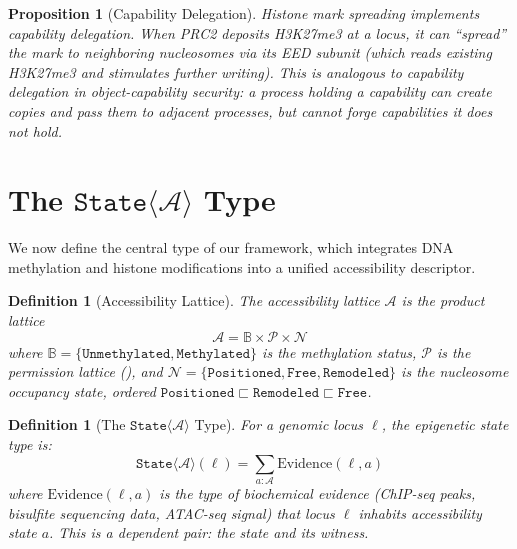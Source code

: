 \documentclass[12pt,a4paper]{article}
\newtheorem{proposition}[theorem]{Proposition}
\newtheorem{definition}[theorem]{Definition}
\newcommand{\Meth}{\texttt{Methylated}}
\newcommand{\Unmeth}{\texttt{Unmethylated}}
\newcommand{\StateT}{\texttt{State}}
\begin{document}
\begin{proposition}[Capability Delegation]
\label{prop:delegation}
Histone mark spreading implements capability delegation. When PRC2 deposits H3K27me3 at a locus, it can ``spread'' the mark to neighboring nucleosomes via its EED subunit (which reads existing H3K27me3 and stimulates further writing). This is analogous to capability delegation in object-capability security: a process holding a capability can create copies and pass them to adjacent processes, but cannot forge capabilities it does not hold.
\end{proposition}

\section{The \texorpdfstring{$\StateT\langle\mathcal{A}\rangle$}{State<A>} Type}
\label{sec:state-type}

We now define the central type of our framework, which integrates DNA methylation and histone modifications into a unified accessibility descriptor.

\begin{definition}[Accessibility Lattice]
\label{def:acc-lattice}
The \emph{accessibility lattice} $\mathcal{A}$ is the product lattice
\[
    \mathcal{A} = \mathbb{B} \times \mathcal{P} \times \mathcal{N}
\]
where $\mathbb{B} = \{\Unmeth, \Meth\}$ is the methylation status, $\mathcal{P}$ is the permission lattice (), and $\mathcal{N} = \{\texttt{Positioned}, \texttt{Free}, \texttt{Remodeled}\}$ is the nucleosome occupancy state, ordered $\texttt{Positioned} \sqsubset \texttt{Remodeled} \sqsubset \texttt{Free}$.
\end{definition}

\begin{definition}[The $\StateT\langle\mathcal{A}\rangle$ Type]
\label{def:state-type}
For a genomic locus $\ell$, the \emph{epigenetic state type} is:
\[
    \StateT\langle\mathcal{A}\rangle(\ell) = \sum_{a : \mathcal{A}} \mathrm{Evidence}(\ell, a)
\]
where $\mathrm{Evidence}(\ell, a)$ is the type of biochemical evidence (ChIP-seq peaks, bisulfite sequencing data, ATAC-seq signal) that locus $\ell$ inhabits accessibility state $a$. This is a \emph{dependent pair}: the state and its witness.
\end{definition}
\end{document}
